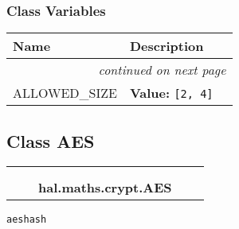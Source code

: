   \subsubsection{Class Variables}

    \vspace{-1cm}
\hspace{\varindent}\begin{longtable}{|p{\varnamewidth}|p{\vardescrwidth}|l}
\cline{1-2}
\cline{1-2} \centering \textbf{Name} & \centering \textbf{Description}& \\
\cline{1-2}
\endhead\cline{1-2}\multicolumn{3}{r}{\small\textit{continued on next page}}\\\endfoot\cline{1-2}
\endlastfoot\raggedright A\-L\-L\-O\-W\-E\-D\-\_\-S\-I\-Z\-E\- & \raggedright \textbf{Value:} 
{\tt [2, 4]}&\\
\cline{1-2}
\end{longtable}



\subsection{Class AES}

    \label{hal:maths:crypt:AES}
\begin{tabular}{cccccc}
\multicolumn{2}{r}{\settowidth{\BCL}{object}\multirow{2}{\BCL}{object}}
&&
  \\\cline{3-3}
  &&\multicolumn{1}{c|}{}
&&
  \\
&&\multicolumn{2}{l}{\textbf{hal.maths.crypt.AES}}
\end{tabular}

\begin{alltt}
aes hash 
\end{alltt}



